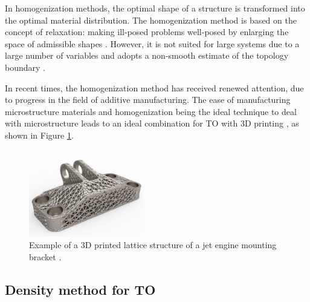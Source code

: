 In  homogenization  methods,  the  optimal  shape  of  a  structure  is  transformed  into  the optimal  material  distribution. The homogenization method is based on the concept of relaxation: making ill-posed problems well-posed by enlarging the space of admissible shapes \parencite{allaire2019homogenization}. However, it is not suited for large systems due to a large number of variables and adopts a non-smooth estimate of the topology boundary \parencite{midha_2018}.

In recent times, the homogenization method has received renewed attention, due to progress in the field of additive manufacturing. The ease of manufacturing microstructure materials and homogenization being the ideal technique to deal with microstructure leads to an ideal combination for TO with 3D printing \parencite{guo2013additive}, as shown in Figure \ref{fig:MDP_Crystallon}.

\begin{figure}[h!]
    \centering
    \includegraphics[width=0.45\textwidth]{Figures/Ch_MDP/Crystallon.jpg}
    \caption{Example of a 3D printed lattice structure of a jet engine mounting bracket \parencite{morgan2014ge, allaire2019homogenization}.}
    \label{fig:MDP_Crystallon}
\end{figure}

\subsection{Density method for TO}

